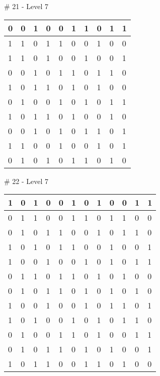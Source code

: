 \# 21 - Level 7 \newline
\begin{tabular}{|m{\collen}|m{\collen}|m{\collen}|m{\collen}|m{\collen}|m{\collen}|m{\collen}|m{\collen}|m{\collen}|m{\collen}|}
\hline
  0 & 0 & 1 & 0 & 0 & 1 & 1 & 0 & 1 & 1 \\
\hline
  1 & 1 & 0 & 1 & 1 & 0 & 0 & 1 & 0 & 0 \\
\hline
  1 & 1 & 0 & 1 & 0 & 0 & 1 & 0 & 0 & 1 \\
\hline
  0 & 0 & 1 & 0 & 1 & 1 & 0 & 1 & 1 & 0 \\
\hline
  1 & 0 & 1 & 1 & 0 & 1 & 0 & 1 & 0 & 0 \\
\hline
  0 & 1 & 0 & 0 & 1 & 0 & 1 & 0 & 1 & 1 \\
\hline
  1 & 0 & 1 & 1 & 0 & 1 & 0 & 0 & 1 & 0 \\
\hline
  0 & 0 & 1 & 0 & 1 & 0 & 1 & 1 & 0 & 1 \\
\hline
  1 & 1 & 0 & 0 & 1 & 0 & 0 & 1 & 0 & 1 \\
\hline
  0 & 1 & 0 & 1 & 0 & 1 & 1 & 0 & 1 & 0 \\
\hline
\end{tabular}


\smallskip

\# 22 - Level 7 \newline
\begin{tabular}{|m{\collen}|m{\collen}|m{\collen}|m{\collen}|m{\collen}|m{\collen}|m{\collen}|m{\collen}|m{\collen}|m{\collen}|m{\collen}|m{\collen}|}
\hline
  1 & 0 & 1 & 0 & 0 & 1 & 0 & 1 & 0 & 0 & 1 & 1 \\
\hline
  0 & 1 & 1 & 0 & 0 & 1 & 1 & 0 & 1 & 1 & 0 & 0 \\
\hline
  0 & 1 & 0 & 1 & 1 & 0 & 0 & 1 & 0 & 1 & 1 & 0 \\
\hline
  1 & 0 & 1 & 0 & 1 & 1 & 0 & 0 & 1 & 0 & 0 & 1 \\
\hline
  1 & 0 & 0 & 1 & 0 & 0 & 1 & 0 & 1 & 0 & 1 & 1 \\
\hline
  0 & 1 & 1 & 0 & 1 & 1 & 0 & 1 & 0 & 1 & 0 & 0 \\
\hline
  0 & 1 & 0 & 1 & 1 & 0 & 1 & 0 & 1 & 0 & 1 & 0 \\
\hline
  1 & 0 & 0 & 1 & 0 & 0 & 1 & 0 & 1 & 1 & 0 & 1 \\
\hline
  1 & 0 & 1 & 0 & 0 & 1 & 0 & 1 & 0 & 1 & 1 & 0 \\
\hline
  0 & 1 & 0 & 0 & 1 & 1 & 0 & 1 & 0 & 0 & 1 & 1 \\
\hline
  0 & 1 & 0 & 1 & 1 & 0 & 1 & 0 & 1 & 0 & 0 & 1 \\
\hline
  1 & 0 & 1 & 1 & 0 & 0 & 1 & 1 & 0 & 1 & 0 & 0 \\
\hline
\end{tabular}


